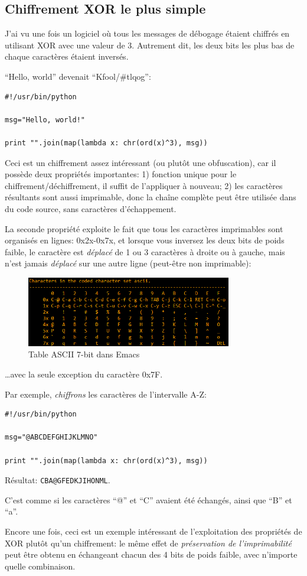 \subsection{Chiffrement XOR le plus simple}

J'ai vu une fois un logiciel où tous les messages de débogage étaient chiffrés en
utilisant XOR avec une valeur de 3.
Autrement dit, les deux bits les plus bas de chaque caractères étaient inversés.

``Hello, world'' devenait ``Kfool/\#tlqog'':

\begin{lstlisting}[caption=Python,style=custompy]
#!/usr/bin/python

msg="Hello, world!"

print "".join(map(lambda x: chr(ord(x)^3), msg))
\end{lstlisting}

Ceci est un chiffrement assez intéressant (ou plutôt une obfuscation), car il possède
deux propriétés importantes:
1) fonction unique pour le chiffrement/déchiffrement, il suffit de l'appliquer à nouveau;
2) les caractères résultants sont aussi imprimable, donc la chaîne complète peut être
utilisée dans du code source, sans caractères d'échappement.

La seconde propriété exploite le fait que tous les caractères imprimables sont organisés
en lignes: 0x2x-0x7x, et lorsque vous inversez les deux bits de poids faible, le caractère
est \emph{déplacé} de 1 ou 3 caractères à droite ou à gauche, mais n'est jamais \emph{déplacé}
sur une autre ligne (peut-être non imprimable):

\begin{figure}[H]
\centering
\includegraphics[width=0.8\textwidth]{ascii_clean.png}
\caption{Table \ac{ASCII} 7-bit dans Emacs}
\end{figure}

\dots avec la seule exception du caractère 0x7F.

Par exemple, \emph{chiffrons} les caractères de l'intervalle A-Z:

\begin{lstlisting}
#!/usr/bin/python

msg="@ABCDEFGHIJKLMNO"

print "".join(map(lambda x: chr(ord(x)^3), msg))
\end{lstlisting}

Résultat: \verb|CBA@GFEDKJIHONML|.

C'est comme si les caractères ``@'' et ``C'' avaient été échangés, ainsi que ``B''
et ``a''.

Encore une fois, ceci est un exemple intéressant de l'exploitation des propriétés
de XOR plutôt qu'un chiffrement:
le même effet de \emph{préservation de l'imprimabilité} peut être obtenu en échangeant
chacun des 4 bits de poids faible, avec n'importe quelle combinaison.

